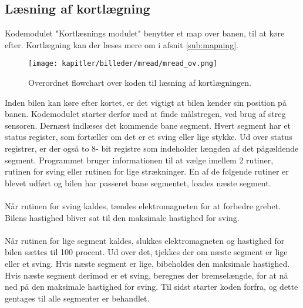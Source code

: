 \newpage

\subsection{Læsning af kortlægning}

Kodemodulet "Kortlæsnings modulet" benytter et map over banen, til at køre efter. Kortlægning kan der læses mere om i afsnit \ref{sub:mapning}.

\begin{figure}[ht]
\centering
\texttt{[image: kapitler/billeder/mread/mread\_ov.png]}
\caption{Overordnet flowchart over koden til læsning af kortlægningen.}
\label{fig:mread}
\end{figure}

Inden bilen kan køre efter kortet, er det vigtigt at bilen kender sin position på banen. Kodemodulet starter derfor med at finde målstregen, ved brug af streg sensoren. Dernæst indlæses det kommende bane segment. Hvert segment har et status register, som fortæller om det er et sving eller lige stykke. Ud over status registrer, er der også to 8- bit registre som indeholder længden af det pågældende segment. Programmet bruger informationen til at vælge imellem 2 rutiner, rutinen for sving eller rutinen for lige strækninger. En af de følgende rutiner er blevet udført og bilen har passeret bane segmentet, loades næste segment.\\
\\
Når rutinen for sving kaldes, tændes elektromagneten for at forbedre grebet. Bilens hastighed bliver sat til den maksimale hastighed for sving.\\
\\
Når rutinen for lige segment kaldes, slukkes elektromagneten og hastighed for bilen sættes til 100 procent. Ud over det, tjekkes der om næste segment er lige eller et sving. Hvis næste segment er lige, bibeholdes den maksimale hastighed. Hvis næste segment derimod er et sving, beregnes der bremselængde, for at nå ned på den maksimale hastighed for sving. Til sidst starter koden forfra, og dette gentages til alle segmenter er behandlet.
